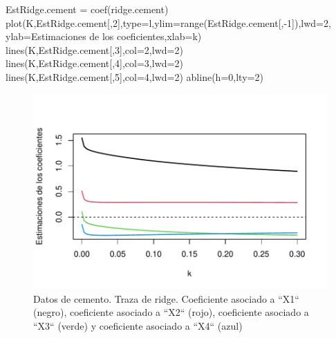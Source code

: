 \documentclass[
]{article}
\newenvironment{Shaded}{\begin{snugshade}}{\end{snugshade}}
\newcommand{\AttributeTok}[1]{\textcolor[rgb]{0.77,0.63,0.00}{#1}}
\newcommand{\DecValTok}[1]{\textcolor[rgb]{0.00,0.00,0.81}{#1}}
\newcommand{\FunctionTok}[1]{\textcolor[rgb]{0.00,0.00,0.00}{#1}}
\newcommand{\NormalTok}[1]{#1}
\newcommand{\OtherTok}[1]{\textcolor[rgb]{0.56,0.35,0.01}{#1}}
\newcommand{\SpecialCharTok}[1]{\textcolor[rgb]{0.00,0.00,0.00}{#1}}
\newcommand{\StringTok}[1]{\textcolor[rgb]{0.31,0.60,0.02}{#1}}
\begin{document}
\begin{Shaded}
\begin{Highlighting}[]
\NormalTok{EstRidge.cement }\OtherTok{=} \FunctionTok{coef}\NormalTok{(ridge.cement)}
\FunctionTok{plot}\NormalTok{(K,EstRidge.cement[,}\DecValTok{2}\NormalTok{],}\AttributeTok{type=}\StringTok{\textquotesingle{}l\textquotesingle{}}\NormalTok{,}\AttributeTok{ylim=}\FunctionTok{range}\NormalTok{(EstRidge.cement[,}\SpecialCharTok{{-}}\DecValTok{1}\NormalTok{]),}\AttributeTok{lwd=}\DecValTok{2}\NormalTok{,}
     \AttributeTok{ylab=}\StringTok{\textquotesingle{}Estimaciones de los coeficientes\textquotesingle{}}\NormalTok{,}\AttributeTok{xlab=}\StringTok{\textquotesingle{}k\textquotesingle{}}\NormalTok{)}
\FunctionTok{lines}\NormalTok{(K,EstRidge.cement[,}\DecValTok{3}\NormalTok{],}\AttributeTok{col=}\DecValTok{2}\NormalTok{,}\AttributeTok{lwd=}\DecValTok{2}\NormalTok{)}
\FunctionTok{lines}\NormalTok{(K,EstRidge.cement[,}\DecValTok{4}\NormalTok{],}\AttributeTok{col=}\DecValTok{3}\NormalTok{,}\AttributeTok{lwd=}\DecValTok{2}\NormalTok{)}
\FunctionTok{lines}\NormalTok{(K,EstRidge.cement[,}\DecValTok{5}\NormalTok{],}\AttributeTok{col=}\DecValTok{4}\NormalTok{,}\AttributeTok{lwd=}\DecValTok{2}\NormalTok{)}
\FunctionTok{abline}\NormalTok{(}\AttributeTok{h=}\DecValTok{0}\NormalTok{,}\AttributeTok{lty=}\DecValTok{2}\NormalTok{)}
\end{Highlighting}
\end{Shaded}

\begin{figure}

{\centering \includegraphics{MLG2_files/figure-latex/CementTrazaRidge-1} 

}

\caption{Datos de cemento. Traza de ridge. Coeficiente asociado a ``X1`` (negro), coeficiente asociado a ``X2`` (rojo), coeficiente asociado a ``X3`` (verde) y coeficiente asociado a ``X4`` (azul)}\label{fig:CementTrazaRidge}
\end{figure}
\end{document}
